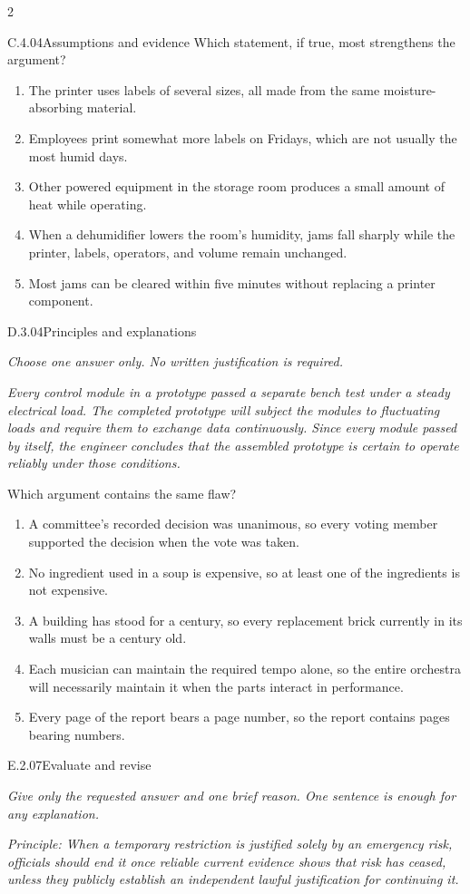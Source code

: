 \documentclass[9pt]{extarticle}
\newcommand{\choice}[1]{\item #1}
\begin{document}
\begin{multicols}{2}
\begin{DenseCoreProblem}{C.4.04}{Assumptions and evidence}
Which statement, if true, most strengthens the argument?
\begin{enumerate}[label=(\alph*)]
  \choice{The printer uses labels of several sizes, all made from the same moisture-absorbing material.}
  \choice{Employees print somewhat more labels on Fridays, which are not usually the most humid days.}
  \choice{Other powered equipment in the storage room produces a small amount of heat while operating.}
  \choice{When a dehumidifier lowers the room's humidity, jams fall sharply while the printer, labels, operators, and volume remain unchanged.}
  \choice{Most jams can be cleared within five minutes without replacing a printer component.}
\end{enumerate}
\end{DenseCoreProblem}
\begin{DenseCoreProblem}{D.3.04}{Principles and explanations}
{\scriptsize\textit{Choose one answer only. No written justification is required.}\par}
\emph{Every control module in a prototype passed a separate bench test under a steady electrical load. The completed prototype will subject the modules to fluctuating loads and require them to exchange data continuously. Since every module passed by itself, the engineer concludes that the assembled prototype is certain to operate reliably under those conditions.}

Which argument contains the same flaw?
\begin{enumerate}[label=(\alph*)]
  \choice{A committee's recorded decision was unanimous, so every voting member supported the decision when the vote was taken.}
  \choice{No ingredient used in a soup is expensive, so at least one of the ingredients is not expensive.}
  \choice{A building has stood for a century, so every replacement brick currently in its walls must be a century old.}
  \choice{Each musician can maintain the required tempo alone, so the entire orchestra will necessarily maintain it when the parts interact in performance.}
  \choice{Every page of the report bears a page number, so the report contains pages bearing numbers.}
\end{enumerate}
\end{DenseCoreProblem}
\begin{DenseCoreProblem}{E.2.07}{Evaluate and revise}
{\scriptsize\textit{Give only the requested answer and one brief reason. One sentence is enough for any explanation.}\par}
\emph{Principle: When a temporary restriction is justified solely by an emergency risk, officials should end it once reliable current evidence shows that risk has ceased, unless they publicly establish an independent lawful justification for continuing it.}


\end{DenseCoreProblem}
\end{multicols}
\end{document}

